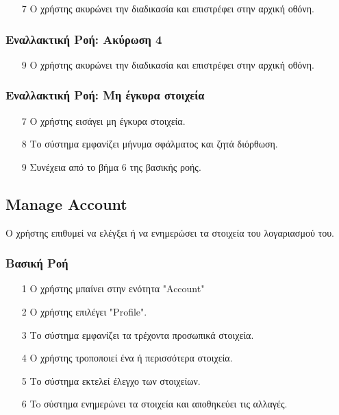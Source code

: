 \begin{enumerate}
    \item[7] Ο χρήστης ακυρώνει την διαδικασία και επιστρέφει στην αρχική οθόνη.
\end{enumerate}

\subsubsection{Εναλλακτική Ροή: Ακύρωση 4}

\begin{enumerate}
    \item[9] Ο χρήστης ακυρώνει την διαδικασία και επιστρέφει στην αρχική οθόνη.
\end{enumerate}

\subsubsection{Εναλλακτική Ροή: Μη έγκυρα στοιχεία}

\begin{enumerate}
    \item[7] Ο χρήστης εισάγει μη έγκυρα στοιχεία.
    \item[8] Το σύστημα εμφανίζει μήνυμα σφάλματος και ζητά διόρθωση.
    \item[9] Συνέχεια από το βήμα 6 της βασικής ροής.
\end{enumerate}

\newpage

\subsection{Manage Account}
\label{uc:manage-account}

Ο χρήστης επιθυμεί να ελέγξει ή να ενημερώσει τα στοιχεία του λογαριασμού του.

\subsubsection{Βασική Ροή}

\begin{enumerate}
    \item[1] Ο χρήστης μπαίνει στην ενότητα "Account"
    \item[2] O χρήστης επιλέγει "Profile".
    \item[3] Το σύστημα εμφανίζει τα τρέχοντα προσωπικά στοιχεία.
    \item[4] Ο χρήστης τροποποιεί ένα ή περισσότερα στοιχεία.
    \item[5] Το σύστημα εκτελεί έλεγχο των στοιχείων.
    \item[6] To σύστημα ενημερώνει τα στοιχεία και αποθηκεύει τις αλλαγές.
\end{enumerate}

